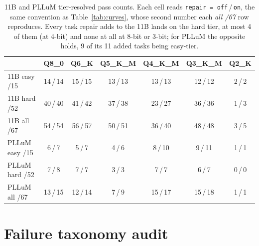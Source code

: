\documentclass[11pt]{article}
\begin{document}
\begin{table}[h]
\centering\small
\caption{11B and PLLuM tier-resolved pass counts. Each cell reads \texttt{repair\,=\,off}\,/\,\texttt{on}, the same convention as Table~\ref{tab:curves}, whose second number each \emph{all /67} row reproduces. Every task repair adds to the 11B lands on the hard tier, at most 4 of them (at 4-bit) and none at all at 8-bit or 3-bit; for PLLuM the opposite holds, 9 of its 11 added tasks being easy-tier.}
\label{tab:split11b}
\begin{tabular}{lcccccc}
\toprule
& Q8\_0 & Q6\_K & Q5\_K\_M & Q4\_K\_M & Q3\_K\_M & Q2\_K \\
\midrule
11B easy /15 & 14\,/\,14 & 15\,/\,15 & 13\,/\,13 & 13\,/\,13 & 12\,/\,12 & 2\,/\,2 \\
11B hard /52 & 40\,/\,40 & 41\,/\,42 & 37\,/\,38 & 23\,/\,27 & 36\,/\,36 & 1\,/\,3 \\
11B all /67  & 54\,/\,54 & 56\,/\,57 & 50\,/\,51 & 36\,/\,40 & 48\,/\,48 & 3\,/\,5 \\
\midrule
PLLuM easy /15 & 6\,/\,7 & 5\,/\,7 & 4\,/\,6 & 8\,/\,10 & 9\,/\,11 & 1\,/\,1 \\
PLLuM hard /52 & 7\,/\,8 & 7\,/\,7 & 3\,/\,3 & 7\,/\,7 & 6\,/\,7 & 0\,/\,0 \\
PLLuM all /67  & 13\,/\,15 & 12\,/\,14 & 7\,/\,9 & 15\,/\,17 & 15\,/\,18 & 1\,/\,1 \\
\bottomrule
\end{tabular}
\end{table}

\FloatBarrier
\Needspace*{0.45\textheight}
\section{Failure taxonomy audit}
\label{app:taxonomy}
\end{document}
